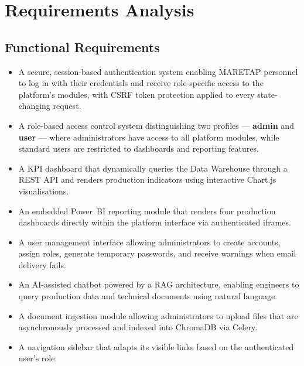\section{Requirements Analysis}
\begin{sloppypar}

\subsection{Functional Requirements}

\begin{itemize}
  \item A secure, session-based authentication system enabling MARETAP personnel
    to log in with their credentials and receive role-specific access to the
    platform's modules, with CSRF token protection applied to every
    state-changing request.

  \item A role-based access control system distinguishing two profiles ---
    \textbf{admin} and \textbf{user} --- where administrators have access to
    all platform modules, while standard users are restricted to dashboards and
    reporting features.

  \item A KPI dashboard that dynamically queries the Data Warehouse through a
    REST API and renders production indicators using interactive Chart.js
    visualisations.

  \item An embedded Power~BI reporting module that renders four production
    dashboards directly within the platform interface via authenticated
    iframes.

  \item A user management interface allowing administrators to create accounts,
    assign roles, generate temporary passwords, and receive warnings when email
    delivery fails.

  \item An AI-assisted chatbot powered by a RAG architecture, enabling engineers
    to query production data and technical documents using natural language.

  \item A document ingestion module allowing administrators to upload files that
    are asynchronously processed and indexed into ChromaDB via Celery.

  \item A navigation sidebar that adapts its visible links based on the
    authenticated user's role.
\end{itemize}


\end{sloppypar}
